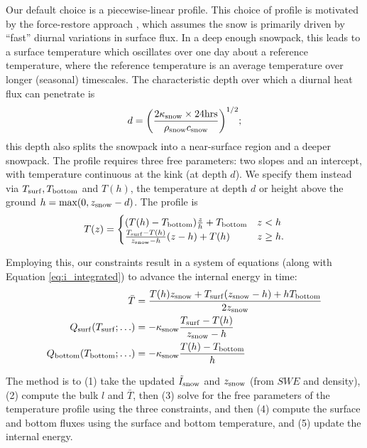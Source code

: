 \documentclass[twoside,10pt]{report}
\begin{document}
Our default choice is a piecewise-linear profile. This choice of profile is motivated by the force-restore approach \citep{Dickinson88}, which assumes the snow is primarily driven by ``fast'' diurnal variations in surface flux. In a deep enough snowpack, this leads to a surface temperature which oscillates over one day about a reference temperature, where the reference temperature is an average temperature over longer (seasonal) timescales. The characteristic depth over which a diurnal heat flux can penetrate is
\begin{equation}
    d = \bigg(\frac{2\kappa_{\rm snow}\times 24 \text{hrs}}{\rho_{\rm snow} c_{\rm snow}}\bigg)^{1/2};
\end{equation}
this depth also splits the snowpack into a near-surface region and a deeper snowpack. The profile requires three free parameters: two slopes and an intercept, with temperature continuous at the kink (at depth $d$). We specify them instead via $T_{\rm surf}, T_{\rm bottom}$ and $T(h)$, the temperature at depth $d$ or height above the ground $h = \text{max}(0,z_{\rm snow}-d)$.  The profile is
\begin{equation} 
T(z) =
    \begin{cases}
         (T(h)-T_{\rm bottom}) \frac{z}{h} +T_{\rm bottom} & z<h \\
        \frac{T_{\rm surf}- T(h)}{z_{\rm snow}-h}(z-h)+ T(h) & z\geq h.
    \end{cases}
\end{equation}

Employing this, our constraints result in a system of equations (along with Equation \eqref{eq:i_integrated}) to advance the internal energy in time:
\begin{align}
\bar{T} &= \frac{T(h)z_{\rm snow}+ T_{\rm surf} (z_{\rm snow}-h) + hT_{\rm bottom}}{ 2z_{\rm snow}}\\
Q_{\rm surf }(T_{\rm surf}; \ldots)& =-\kappa_{\rm snow} \frac{T_{\rm surf}- T(h)}{z_{\rm snow}-h}\\
Q_{\rm bottom }(T_{\rm bottom}; \ldots)& =-\kappa_{\rm snow} \frac{T(h)-T_{\rm bottom}}{h}
\end{align}

The method is to (1) take the updated $\tilde{I}_{\rm snow}$ and $z_{\rm snow}$ (from $SWE$ and density), (2) compute the bulk $l$ and $\bar{T}$, then (3) solve for the free parameters of the temperature profile using the three constraints, and then (4) compute the surface and bottom fluxes using the surface and bottom temperature, and (5) update the internal energy.
\end{document}
